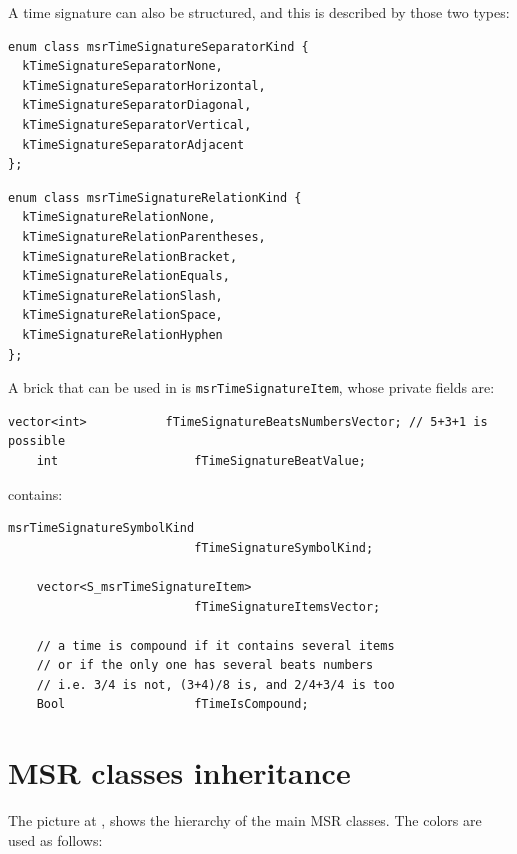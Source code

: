 A time signature can also be structured, and this is described by those two types:
\begin{lstlisting}[language=CPlusPlus]
enum class msrTimeSignatureSeparatorKind {
  kTimeSignatureSeparatorNone,
  kTimeSignatureSeparatorHorizontal,
  kTimeSignatureSeparatorDiagonal,
  kTimeSignatureSeparatorVertical,
  kTimeSignatureSeparatorAdjacent
};
\end{lstlisting}

\begin{lstlisting}[language=CPlusPlus]
enum class msrTimeSignatureRelationKind {
  kTimeSignatureRelationNone,
  kTimeSignatureRelationParentheses,
  kTimeSignatureRelationBracket,
  kTimeSignatureRelationEquals,
  kTimeSignatureRelationSlash,
  kTimeSignatureRelationSpace,
  kTimeSignatureRelationHyphen
};
\end{lstlisting}

A brick that can be used in  is {\tt msrTimeSignatureItem}, whose private fields are:
\begin{lstlisting}[language=CPlusPlus]
    vector<int>           fTimeSignatureBeatsNumbersVector; // 5+3+1 is possible
    int                   fTimeSignatureBeatValue;
\end{lstlisting}

 contains:
\begin{lstlisting}[language=CPlusPlus]
    msrTimeSignatureSymbolKind
                          fTimeSignatureSymbolKind;

    vector<S_msrTimeSignatureItem>
                          fTimeSignatureItemsVector;

    // a time is compound if it contains several items
    // or if the only one has several beats numbers
    // i.e. 3/4 is not, (3+4)/8 is, and 2/4+3/4 is too
    Bool                  fTimeIsCompound;
\end{lstlisting}


\section{MSR classes inheritance}\label{MSR classes inheritance}

The picture at , shows the hierarchy of the main MSR classes. The  colors are used as follows:

